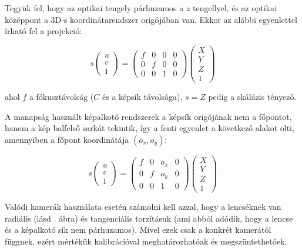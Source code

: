 Tegyük fel, hogy az optikai tengely párhuzamos a $z$ tengellyel, és az optikai középpont a 3D-s koordinátarendszer origójában van. Ekkor az alábbi egyenlettel írható fel a projekció:

\[s \left(\begin{array}{c}
u \\ 
v \\
1
\end{array}\right) = \left(\begin{array}{cccc}
f & 0 & 0 & 0 \\ 
0 & f & 0 & 0\\
0 & 0 & 1 & 0
\end{array}\right) \left(\begin{array}{c}
X \\ 
Y \\
Z \\
1
\end{array}\right)\]

ahol $f$ a fókusztávolság ($C$ és a képsík távolsága), $s = Z$ pedig a skálázis tényező.

A manapság használt képalkotó rendszerek a képsík origójának nem a főpontot, hanem a kép balfelső sarkát tekintik, így a fenti egyenlet a következő  alakot ölti, amennyiben a főpont koordinátája $(o_x, o_y)$:

\[s \left(\begin{array}{c}
u \\ 
v \\
1
\end{array}\right) = \left(\begin{array}{cccc}
f & 0 & o_x & 0 \\ 
0 & f & o_y & 0 \\
0 & 0 & 1 & 0
\end{array}\right) \left(\begin{array}{c}
X \\ 
Y \\
Z \\
1
\end{array}\right)\]

Valódi kamerák használata esetén számolni kell azzal, hogy a lencséknek van radiális (lásd . ábra) és tangenciális torzításuk (ami abból adódik, hogy a lencse és a képalkotó sík nem párhuzamos). Mivel ezek csak a konkrét kamerától függnek, ezért mértékük kalibrációval meghatározhatóak és megszüntethetőek. 

